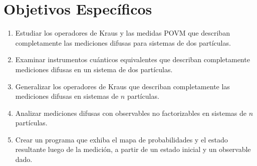 \section*{Objetivos Específicos} %
\begin{enumerate}


\item Estudiar los operadores de Kraus  y las medidas POVM que describan completamente las mediciones difusas para sistemas de dos partículas.

\item 	Examinar instrumentos cuánticos equivalentes que describan completamente mediciones difusas en un sistema de dos partículas.



\item Generalizar los operadores de Kraus que describan completamente las mediciones difusas en sistemas de $n$ partículas.

\item Analizar mediciones difusas con observables no factorizables en sistemas de $n$ partículas.

\item Crear un programa que exhiba el mapa de probabilidades y el estado resultante luego de la medición, a partir de un estado inicial y un observable dado.
\end{enumerate}